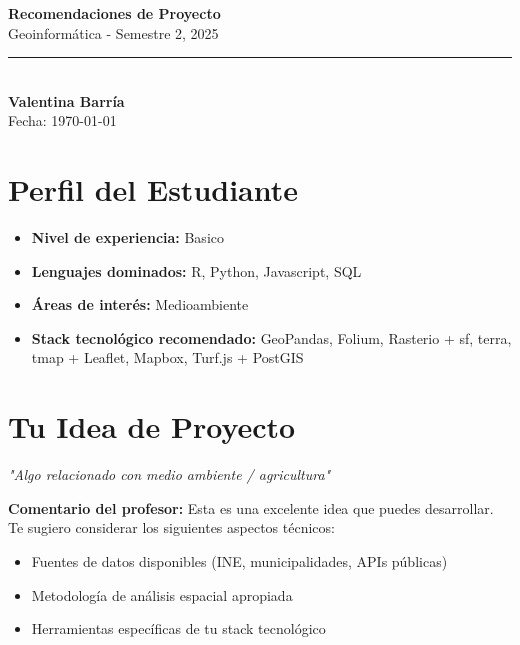 \documentclass[11pt,a4paper]{article}
\begin{document}
\begin{center}
    {\Huge \textbf{Recomendaciones de Proyecto}}\\[0.5cm]
    {\Large \textcolor{usachblue}{Geoinformática - Semestre 2, 2025}}\\[0.3cm]
    \rule{\textwidth}{0.5pt}\\[0.3cm]
    {\LARGE \textbf{Valentina Barría}}\\[0.2cm]
    {\large Fecha: \today}
\end{center}

\vspace{0.5cm}

\section*{ Perfil del Estudiante}

\begin{tcolorbox}[colback=blue!5,colframe=usachblue,title=Resumen de tu Perfil]
\begin{itemize}[leftmargin=*]
    \item \textbf{Nivel de experiencia:} Basico
    \item \textbf{Lenguajes dominados:} R, Python, Javascript, SQL
    \item \textbf{Áreas de interés:} Medioambiente
    \item \textbf{Stack tecnológico recomendado:} GeoPandas, Folium, Rasterio + sf, terra, tmap + Leaflet, Mapbox, Turf.js + PostGIS
\end{itemize}
\end{tcolorbox}


\section*{ Tu Idea de Proyecto}

\begin{tcolorbox}[colback=yellow!10,colframe=darkorange,title=Idea Original]
\textit{"Algo relacionado con medio ambiente / agricultura"}

\vspace{0.3cm}
\textbf{Comentario del profesor:} Esta es una excelente idea que puedes desarrollar. Te sugiero considerar los siguientes aspectos técnicos:
\begin{itemize}
    \item Fuentes de datos disponibles (INE, municipalidades, APIs públicas)
    \item Metodología de análisis espacial apropiada
    \item Herramientas específicas de tu stack tecnológico
\end{itemize}
\end{tcolorbox}
\end{document}
